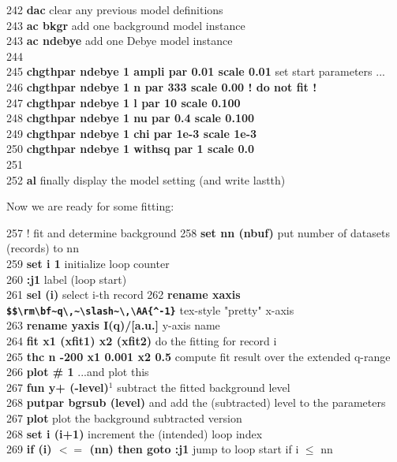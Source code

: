 \documentclass[11pt,fleqn]{book} %
\newcommand{\expl}[1]{\hskip 0.5cm {\color{explgray} #1}}
\begin{document}
\begin{corollary}
242 {\bf dac} \expl{clear any previous model definitions} \\
243 {\bf ac bkgr} \expl{add one background model instance} \\
243 {\bf ac ndebye} \expl{add one Debye model instance} \\
244 \\
245 {\bf chgthpar ndebye 1 ampli    par    0.01        scale  0.01} \expl{set start parameters ...}   \\ 
246 {\bf chgthpar ndebye 1 n        par   333          scale  0.00     ! do not fit ! }   \\
247 {\bf chgthpar ndebye 1 l        par    10          scale  0.100 } \\    
248 {\bf chgthpar ndebye 1 nu       par    0.4         scale  0.100 } \\    
249 {\bf chgthpar ndebye 1 chi      par    1e-3        scale  1e-3  } \\   
250 {\bf chgthpar ndebye 1 withsq   par    1           scale  0.0   } \\ 
251 \\
252 {\bf al} \expl{finally display the model setting (and write lastth)}
\end{corollary}

Now we are ready for some fitting:

\begin{corollary}
257 !  fit and determine background
258 {\bf set nn (nbuf)} \expl{put number of datasets (records) to nn} \\
259 {\bf set i 1} \expl{initialize loop counter} \\
260 {\bf :j1}  \expl{label (loop start)}\\
261 {\bf sel (i)} \expl{select i-th record  }
262 {\bf rename xaxis \verb! $$\rm\bf~q\,~\slash~\,\AA{^-1}! } \expl{tex-style "pretty" x-axis}\\
263 {\bf rename yaxis  I(q)/[a.u.]} \expl{y-axis name} \\
264 {\bf  fit x1 (xfit1) x2 (xfit2)} \expl{do the fitting for record i} \\
265 {\bf  thc n -200 x1 0.001 x2 0.5} \expl{compute fit result over the extended q-range} \\
266 {\bf  plot \# 1} \expl{...and plot this} \\
267 {\bf fun y+ (-level)}$^1$ \expl{subtract the fitted background level} \\
268 {\bf putpar bgrsub (level) } \expl{and add the (subtracted) level to the parameters} \\
267 {\bf plot} \expl{plot the background subtracted version} \\
268 {\bf set i (i+1)} \expl{increment the (intended) loop index} \\
269 {\bf if (i) $<=$ (nn) then goto :j1} \expl{jump to loop start if i $\le$ nn}
\end{corollary}
\end{document}
